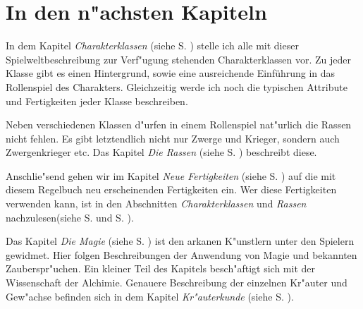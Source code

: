 \section{In den n"achsten Kapiteln}

In dem Kapitel \textit{Charakterklassen} (siehe S. \pageref{charakterklassen}) 
stelle ich alle mit dieser Spielweltbeschreibung zur Verf"ugung stehenden Charakterklassen 
vor. Zu jeder Klasse gibt es einen Hintergrund, sowie eine ausreichende Einführung in das 
Rollenspiel des Charakters. Gleichzeitig werde ich noch die typischen 
Attribute und Fertigkeiten jeder Klasse beschreiben.

\par Neben verschiedenen Klassen d"urfen in einem Rollenspiel nat"urlich die Rassen nicht fehlen. Es gibt 
letztendlich nicht nur Zwerge und Krieger, sondern auch Zwergenkrieger etc. Das Kapitel \textit{Die Rassen} 
(siehe S. \pageref{dierassen}) beschreibt diese.

\par Anschlie"send gehen wir im Kapitel \textit{Neue Fertigkeiten} 
(siehe S. \pageref{neuefertigkeiten}) auf die mit diesem Regelbuch neu erscheinenden Fertigkeiten ein. 
Wer diese Fertigkeiten verwenden kann, ist in den Abschnitten \textit{Charakterklassen} und \textit{Rassen} 
nachzulesen(siehe S. \pageref{charakterklassen} und S. \pageref{dierassen}).

\par Das Kapitel \textit{Die Magie} (siehe S. \pageref{diemagie}) ist den arkanen K"unstlern 
unter den Spielern gewidmet. Hier folgen Beschreibungen der Anwendung von Magie und 
bekannten Zauberspr"uchen. Ein kleiner Teil des Kapitels besch"aftigt sich mit der 
Wissenschaft der Alchimie. Genauere Beschreibung der einzelnen Kr"auter 
und Gew"achse befinden sich in dem Kapitel \textit{Kr"auterkunde} (siehe S. \pageref{kraeuterkunde}).
